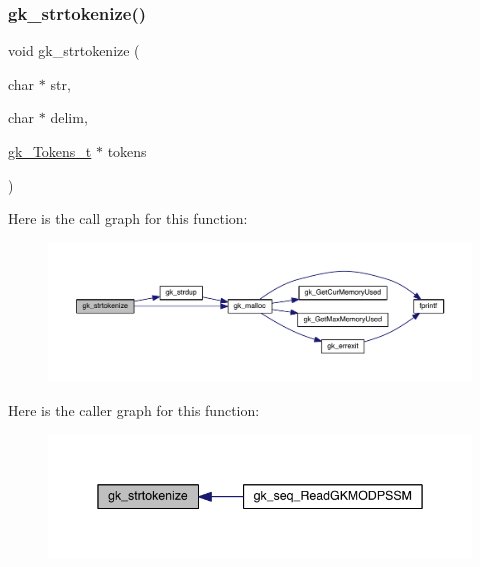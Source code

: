 \subsubsection{\texorpdfstring{gk\+\_\+strtokenize()}{gk\_strtokenize()}}
{\footnotesize\ttfamily void gk\+\_\+strtokenize (\begin{DoxyParamCaption}\item[{char $\ast$}]{str,  }\item[{char $\ast$}]{delim,  }\item[{\hyperlink{a00654}{gk\+\_\+\+Tokens\+\_\+t} $\ast$}]{tokens }\end{DoxyParamCaption})}

Here is the call graph for this function\+:\nopagebreak
\begin{figure}[H]
\begin{center}
\leavevmode
\includegraphics[width=350pt]{a00161_a551670b0d23e97d4655a827762c6bacd_cgraph}
\end{center}
\end{figure}
Here is the caller graph for this function\+:\nopagebreak
\begin{figure}[H]
\begin{center}
\leavevmode
\includegraphics[width=342pt]{a00161_a551670b0d23e97d4655a827762c6bacd_icgraph}
\end{center}
\end{figure}
